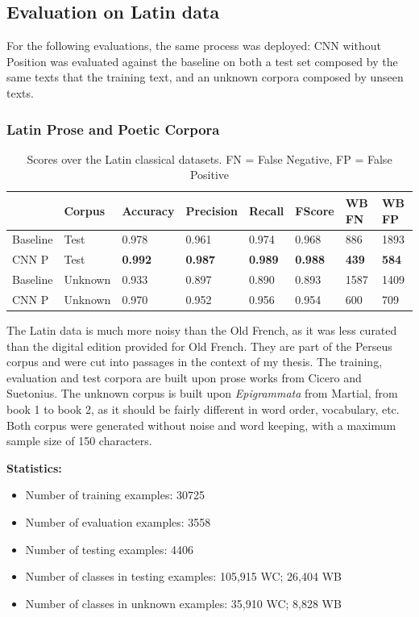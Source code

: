 \documentclass{jdmdh}
\begin{document}
\subsection{Evaluation on Latin data}

For the following evaluations, the same process was deployed: CNN without Position was evaluated against the baseline on both a test set composed by the same texts that the training text, and an unknown corpora composed by unseen texts.

\subsubsection{Latin Prose and Poetic Corpora}

\begin{table}[H]
\centering
\begin{tabular}{llllllll}
\hline
 & Corpus & Accuracy & Precision & Recall & FScore & WB FN & WB FP \\ \hline
Baseline & Test & 0.978 & 0.961 & 0.974 & 0.968 & 886 & 1893 \\
CNN P & Test & \textbf{0.992} & \textbf{0.987} & \textbf{0.989} & \textbf{0.988} & \textbf{439} & \textbf{584} \\ \hline
Baseline & Unknown & 0.933 & 0.897 & 0.890 & 0.893 & 1587 & 1409 \\
CNN P & Unknown & 0.970 & 0.952 & 0.956 & 0.954 & 600 & 709 \\ \hline
\end{tabular}
\caption{Scores over the Latin classical datasets. FN = False Negative, FP = False Positive}
\label{tab:latin_corpora}
\end{table}

The Latin data is much more noisy than the Old French, as it was less curated than the digital edition provided for Old French. They are part of the Perseus corpus \citet{perseus} and were cut into passages in the context of my thesis. The training, evaluation and test corpora are built upon prose works from Cicero and Suetonius. The unknown corpus is built upon \textit{Epigrammata} from Martial, from book 1 to book 2, as it should be fairly different in word order, vocabulary, etc. Both corpus were generated without noise and word keeping, with a maximum sample size of 150 characters.

\textbf{Statistics:}
\begin{itemize}
\item Number of training examples: 30725
\item Number of evaluation examples: 3558
\item Number of testing examples: 4406
\item Number of classes in testing examples: 105,915 WC; 26,404 WB
\item Number of classes in unknown examples: 35,910 WC; 8,828 WB
\end{itemize}
\end{document}

